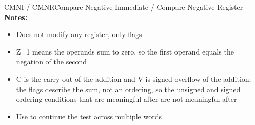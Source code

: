 \begin{instructionbox}{CMNI / CMNR}{Compare Negative Immediate / Compare Negative Register}
	\textbf{Notes:}
	\begin{itemize}
		\item Does not modify any register, only flags
		\item Z=1 means the operands sum to zero, so the first operand equals the negation of the second
		\item C is the carry out of the addition and V is signed overflow of the addition; the flags describe the sum, not an
		      ordering, so the unsigned and signed ordering conditions that are meaningful after  are not meaningful
		      after 
		\item Use  to continue the test across multiple words
	\end{itemize}
\end{instructionbox}


